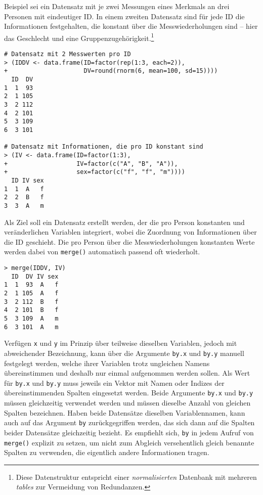Beispiel sei ein Datensatz mit je zwei Messungen eines Merkmals an drei Personen mit eindeutiger ID. In einem zweiten Datensatz sind für jede ID die Informationen festgehalten, die konstant über die Messwiederholungen sind -- hier das Geschlecht und eine Gruppenzugehörigkeit.\footnote{Diese Datenstruktur entspricht einer \emph{normalisierten} Datenbank mit mehreren \emph{tables} zur Vermeidung von Redundanzen.}
\begin{lstlisting}
# Datensatz mit 2 Messwerten pro ID
> (IDDV <- data.frame(ID=factor(rep(1:3, each=2)),
+                     DV=round(rnorm(6, mean=100, sd=15))))
  ID  DV
1  1  93
2  1 105
3  2 112
4  2 101
5  3 109
6  3 101

# Datensatz mit Informationen, die pro ID konstant sind
> (IV <- data.frame(ID=factor(1:3),
+                   IV=factor(c("A", "B", "A")),
+                   sex=factor(c("f", "f", "m"))))
  ID IV sex
1  1  A   f
2  2  B   f
3  3  A   m
\end{lstlisting}

Als Ziel soll ein Datensatz erstellt werden, der die pro Person konstanten und veränderlichen Variablen integriert, wobei die Zuordnung von Informationen über die ID geschieht. Die pro Person über die Messwiederholungen konstanten Werte werden dabei von \lstinline!merge()! automatisch passend oft wiederholt.
\begin{lstlisting}
> merge(IDDV, IV)
  ID  DV IV sex
1  1  93  A   f
2  1 105  A   f
3  2 112  B   f
4  2 101  B   f
5  3 109  A   m
6  3 101  A   m
\end{lstlisting}

Verfügen \lstinline!x! und \lstinline!y! im Prinzip über teilweise dieselben Variablen, jedoch mit abweichender Bezeichnung, kann über die Argumente \lstinline!by.x! und \lstinline!by.y! manuell festgelegt werden, welche ihrer Variablen trotz ungleichen Namens übereinstimmen und deshalb nur einmal aufgenommen werden sollen. Als Wert für \lstinline!by.x! und \lstinline!by.y! muss jeweils ein Vektor mit Namen oder Indizes der übereinstimmenden Spalten eingesetzt werden. Beide Argumente \lstinline!by.x! und \lstinline!by.y! müssen gleichzeitig verwendet werden und müssen dieselbe Anzahl von gleichen Spalten bezeichnen. Haben beide Datensätze dieselben Variablennamen, kann auch auf das Argument \lstinline!by! zurückgegriffen werden, das sich dann auf die Spalten beider Datensätze gleichzeitig bezieht. Es empfiehlt sich, \lstinline!by! in jedem Aufruf von \lstinline!merge()! explizit zu setzen, um nicht zum Abgleich versehentlich gleich benannte Spalten zu verwenden, die eigentlich andere Informationen tragen.

